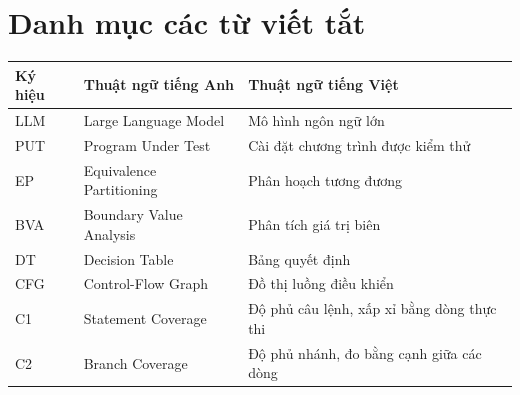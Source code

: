 \chapter*{Danh mục các từ viết tắt}

\begin{tabular}{@{}p{.12\linewidth}p{.34\linewidth}p{.46\linewidth}@{}}
\toprule
Ký hiệu & Thuật ngữ tiếng Anh & Thuật ngữ tiếng Việt \\
\midrule
LLM & Large Language Model & Mô hình ngôn ngữ lớn \\
PUT & Program Under Test & Cài đặt chương trình được kiểm thử \\
EP & Equivalence Partitioning & Phân hoạch tương đương \\
BVA & Boundary Value Analysis & Phân tích giá trị biên \\
DT & Decision Table & Bảng quyết định \\
CFG & Control-Flow Graph & Đồ thị luồng điều khiển \\
C1 & Statement Coverage & Độ phủ câu lệnh, xấp xỉ bằng dòng thực thi \\
C2 & Branch Coverage & Độ phủ nhánh, đo bằng cạnh giữa các dòng \\
\bottomrule
\end{tabular}
